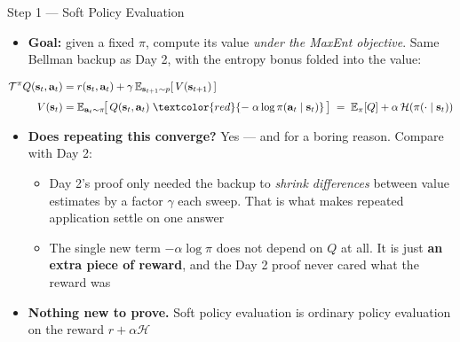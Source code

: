 \begin{frame}{Step 1 --- Soft Policy Evaluation}
\begin{itemize}
    \item \textbf{Goal:} given a fixed $\pi$, compute its value \emph{under the MaxEnt objective}. Same Bellman backup as Day 2, with the entropy bonus folded into the value:
\end{itemize}
\begin{align*}
\mathcal{T}^{\pi} Q(\mathbf{s}_t, \mathbf{a}_t) &= r(\mathbf{s}_t, \mathbf{a}_t) + \gamma\, \mathbb{E}_{\mathbf{s}_{t+1} \sim p}\!\left[\, V(\mathbf{s}_{t+1})\, \right] \\[0.3em]
V(\mathbf{s}_t) &= \mathbb{E}_{\mathbf{a}_t \sim \pi}\!\big[\, Q(\mathbf{s}_t, \mathbf{a}_t) \; \textcolor{red}{-\; \alpha \log \pi(\mathbf{a}_t \mid \mathbf{s}_t)} \,\big]
\;=\; \mathbb{E}_{\pi}[Q] + \alpha\,\mathcal{H}(\pi(\cdot\mid\mathbf{s}_t))
\end{align*}
\begin{itemize}
    \item \textbf{Does repeating this converge?} Yes --- and for a boring reason. Compare with Day 2:
    \begin{itemize}
        \item Day 2's proof only needed the backup to \emph{shrink differences} between value estimates by a factor $\gamma$ each sweep. That is what makes repeated application settle on one answer
        \item The single new term $-\alpha\log\pi$ does not depend on $Q$ at all. It is just \textbf{an extra piece of reward}, and the Day 2 proof never cared what the reward was
    \end{itemize}
    \item[$\Rightarrow$] \textbf{Nothing new to prove.} Soft policy evaluation is ordinary policy evaluation on the reward $r + \alpha\mathcal{H}$
\end{itemize}
\end{frame}

